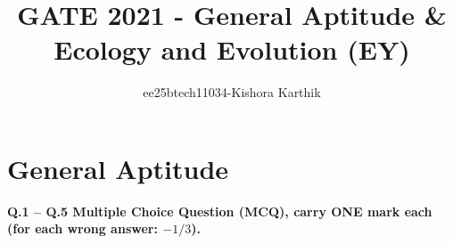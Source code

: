 \documentclass[journal]{IEEEtran}
\begin{document}
\vspace{3cm}


\title{GATE 2021 - General Aptitude \& Ecology and Evolution (EY)}
\author{ee25btech11034-Kishora Karthik}
\maketitle

{\let\newpage\relax\maketitle}

\renewcommand{\thefigure}{\theenumi}
\renewcommand{\thetable}{\theenumi}
\setlength{\intextsep}{10pt} 

\section*{\textbf{General Aptitude}}
\textbf{Q.1 -- Q.5 Multiple Choice Question (MCQ), carry ONE mark each (for each wrong answer: $-1/3$).}
 
\end{document}
